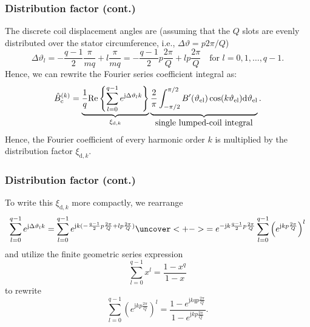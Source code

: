 \begin{frame}
	\frametitle{Distribution factor  (cont.)}
	The discrete coil displacement angles are (assuming that the $Q$ slots are evenly distributed over the stator circumference, i.e., $\Delta \vartheta = p 2  \pi/Q$)
	\begin{equation}
		\Delta\vartheta_l = -\frac{q-1}{2} \frac{\pi}{m q} + l \frac{\pi}{m q} = -\frac{q-1}{2} p \frac{2\pi}{Q} + l p \frac{2\pi}{Q} \quad \mbox{for } l=0,1,\ldots,q-1.
	\end{equation}\pause
	Hence, we can rewrite the Fourier series coefficient integral as:
	\begin{equation}
		\hat{B}_{\mathrm{c}}^{(k)} = \underbrace{\frac{1}{q}\mathrm{Re}\left\{\sum_{l=0}^{q-1} e^{\mathrm{j} \Delta\vartheta_l k}\right\} }_{\xi_{\mathrm{d},k}} \underbrace{\frac{2}{\pi}\int_{-\pi/2}^{\pi/2} B'(\vartheta_\mathrm{el}) \cos(k \vartheta_\mathrm{el}) \mathrm{d}\vartheta_\mathrm{el} \vphantom{\sum_{l=0}^{q-1}}}_{\mbox{single lumped-coil integral}}.
		\label{eq:B_single_phase_coil_fourier_series_coefficients_distributed}
	\end{equation}
	Hence, the Fourier coefficient of every harmonic order $k$ is multiplied by the distribution factor $\xi_{\mathrm{d},k}$.
\end{frame}

\begin{frame}
	\frametitle{Distribution factor  (cont.)}
	\onslide<+->
	To write this $\xi_{\mathrm{d},k}$ more compactly, we rearrange
	\begin{equation}
		\sum_{l=0}^{q-1} e^{\mathrm{j} \Delta\vartheta_l k} = \sum_{l=0}^{q-1} e^{\mathrm{j} k (-\frac{q-1}{2} p \frac{2\pi}{Q} + l p \frac{2\pi}{Q})} \uncover<+->{= e^{- \mathrm{j} k \frac{q-1}{2} p \frac{2\pi}{Q}} \sum_{l=0}^{q-1} \left(e^{\mathrm{j} k  p \frac{2\pi}{Q}}\right)^l}
		\label{eq:sum_exp_distribution_factor}
	\end{equation}
	\onslide<+->
	and utilize the finite geometric series expression
	$$
		\sum_{l=0}^{q-1} x^l = \frac{1-x^q}{1-x}
	$$
	\onslide<+->
	to rewrite
	$$
		\sum_{l=0}^{q-1} \left(e^{\mathrm{j} k  p \frac{2\pi}{Q}}\right)^l = \frac{1-e^{\mathrm{j} k q p \frac{2\pi}{Q}}}{1-e^{\mathrm{j} k  p \frac{2\pi}{Q}}}.
	$$
\end{frame}

